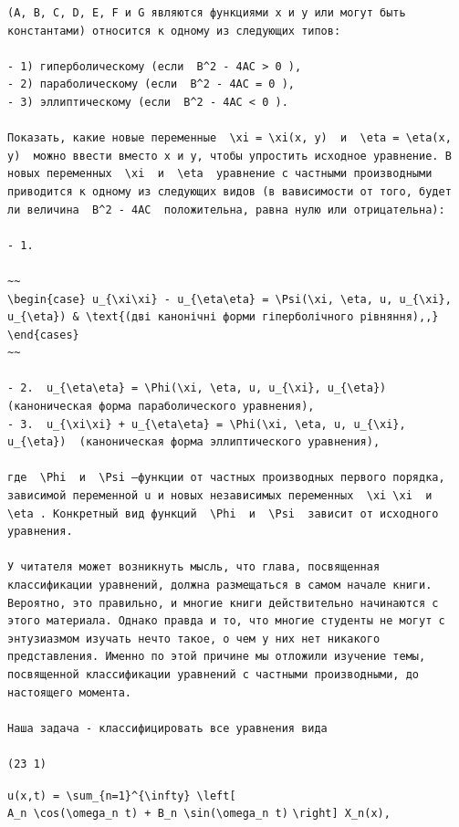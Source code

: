 \documentclass[
  ukrainian,
]{article}
\begin{document}
\begin{verbatim}
(A, B, C, D, E, F и G являются функциями x и y или могут быть константами) относится к одному из следующих типов:

- 1) гиперболическому (если  B^2 - 4AC > 0 ),
- 2) параболическому (если  B^2 - 4AC = 0 ),
- 3) эллиптическому (если  B^2 - 4AC < 0 ).

Показать, какие новые переменные  \xi = \xi(x, y)  и  \eta = \eta(x, y)  можно ввести вместо x и y, чтобы упростить исходное уравнение. В новых переменных  \xi  и  \eta  уравнение с частными производными приводится к одному из следующих видов (в вависимости от того, будет ли величина  B^2 - 4AC  положительна, равна нулю или отрицательна):

- 1.  

~~
\begin{case} u_{\xi\xi} - u_{\eta\eta} = \Psi(\xi, \eta, u, u_{\xi}, u_{\eta}) & \text{(дві канонічні форми гіперболічного рівняння),,} \end{cases}
~~

- 2.  u_{\eta\eta} = \Phi(\xi, \eta, u, u_{\xi}, u_{\eta})  (каноническая форма параболического уравнения),
- 3.  u_{\xi\xi} + u_{\eta\eta} = \Phi(\xi, \eta, u, u_{\xi}, u_{\eta})  (каноническая форма эллиптического уравнения),

где  \Phi  и  \Psi —функции от частных производных первого порядка, зависимой переменной u и новых независимых переменных  \xi \xi  и  \eta . Конкретный вид функций  \Phi  и  \Psi  зависит от исходного уравнения.

У читателя может возникнуть мысль, что глава, посвященная классификации уравнений, должна размещаться в самом начале книги. Вероятно, это правильно, и многие книги действительно начинаются с этого материала. Однако правда и то, что многие студенты не могут с энтузиазмом изучать нечто такое, о чем у них нет никакого представления. Именно по этой причине мы отложили изучение темы, посвященной классификации уравнений с частными производными, до настоящего момента.

Наша задача - классифицировать все уравнения вида

(23 1)
\end{verbatim}

\texttt{u(x,t)\ =\ \textbackslash{}sum\_\{n=1\}\^{}\{\textbackslash{}infty\}\ \textbackslash{}left{[}}
\texttt{A\_n\ \textbackslash{}cos(\textbackslash{}omega\_n\ t)\ +\ B\_n\ \textbackslash{}sin(\textbackslash{}omega\_n\ t)}
\texttt{\textbackslash{}right{]}\ X\_n(x),}
\end{document}
